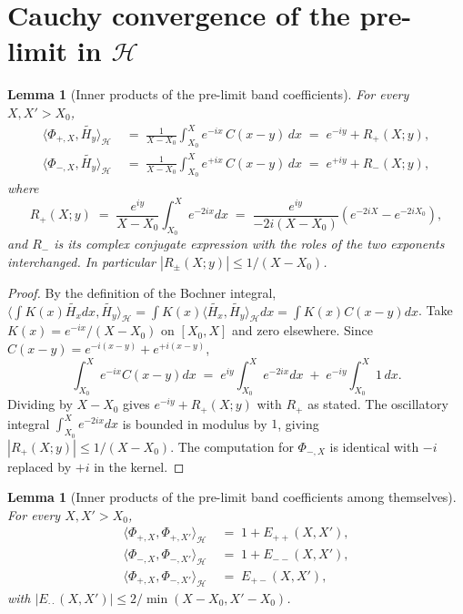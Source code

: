 \documentclass[11pt]{article}
\newtheorem{lemma}[theorem]{Lemma}
\theoremstyle{definition}
\theoremstyle{remark}
\begin{document}
\section{Cauchy convergence of the pre-limit in \texorpdfstring{$\mathcal{H}$}{H}}\label{sec:convergence}

\begin{lemma}[Inner products of the pre-limit band coefficients]\label{lem:pre-inner-products}
For every $X,X'>X_0$,
\begin{align*}
  \langle \Phi_{+,X},\widetilde{H_y}\rangle_{\mathcal{H}} &\;=\;\frac{1}{X-X_0}\int_{X_0}^X e^{-ix}\,C(x-y)\,dx\;=\;e^{-iy}+R_+(X;y),\\[2pt]
  \langle \Phi_{-,X},\widetilde{H_y}\rangle_{\mathcal{H}} &\;=\;\frac{1}{X-X_0}\int_{X_0}^X e^{+ix}\,C(x-y)\,dx\;=\;e^{+iy}+R_-(X;y),
\end{align*}
where
\[
  R_+(X;y)\;=\;\frac{e^{iy}}{X-X_0}\int_{X_0}^X e^{-2ix}dx\;=\;\frac{e^{iy}}{-2i(X-X_0)}\left(e^{-2iX}-e^{-2iX_0}\right),
\]
and $R_-$ is its complex conjugate expression with the roles of the two exponents interchanged. In particular $|R_\pm(X;y)|\le 1/(X-X_0)$.
\end{lemma}

\begin{proof}
By the definition of the Bochner integral, $\langle\int K(x)\widetilde{H_x}dx,\widetilde{H_y}\rangle_\mathcal{H}=\int K(x)\langle\widetilde{H_x},\widetilde{H_y}\rangle_\mathcal{H}dx=\int K(x)C(x-y)dx$. Take $K(x)=e^{-ix}/(X-X_0)$ on $[X_0,X]$ and zero elsewhere. Since $C(x-y)=e^{-i(x-y)}+e^{+i(x-y)}$,
\[
  \int_{X_0}^X e^{-ix}C(x-y)dx\;=\;e^{iy}\int_{X_0}^X e^{-2ix}dx\;+\;e^{-iy}\int_{X_0}^X 1\,dx.
\]
Dividing by $X-X_0$ gives $e^{-iy}+R_+(X;y)$ with $R_+$ as stated. The oscillatory integral $\int_{X_0}^X e^{-2ix}dx$ is bounded in modulus by $1$, giving $|R_+(X;y)|\le 1/(X-X_0)$. The computation for $\Phi_{-,X}$ is identical with $-i$ replaced by $+i$ in the kernel.
\end{proof}

\begin{lemma}[Inner products of the pre-limit band coefficients among themselves]\label{lem:pre-self-inner}
For every $X,X'>X_0$,
\begin{align*}
  \langle\Phi_{+,X},\Phi_{+,X'}\rangle_{\mathcal{H}} &\;=\;1+E_{++}(X,X'),\\
  \langle\Phi_{-,X},\Phi_{-,X'}\rangle_{\mathcal{H}} &\;=\;1+E_{--}(X,X'),\\
  \langle\Phi_{+,X},\Phi_{-,X'}\rangle_{\mathcal{H}} &\;=\;E_{+-}(X,X'),
\end{align*}
with $|E_{\cdot\cdot}(X,X')|\le 2/\min(X-X_0,X'-X_0)$.
\end{lemma}
\end{document}
